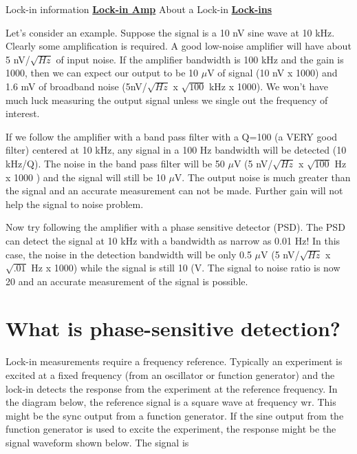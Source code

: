 \documentclass{../lab}
\begin{document}
Lock-in information \href{http://physics111.lib.berkeley.edu/Physics111/Reprints/NMR/Lock-in-Amp.pdf}{\textbf{Lock-in Amp}} About a Lock-in \href{http://physics111.lib.berkeley.edu/Physics111/Reprints/NMR/About-Lock-Ins.pdf}{\textbf{Lock-ins}}

Let's consider an example. Suppose the signal is a 10 nV sine wave at 10 kHz. Clearly some amplification is required. A good low-noise amplifier will have about 5 nV/$ \sqrt{Hz} $ of input noise. If the amplifier bandwidth is 100 kHz and the gain is 1000, then we can expect our output to be 10 $ \mu $V of signal (10 nV x 1000) and 1.6 mV of broadband noise (5nV/$ \sqrt{Hz} $ x $ \sqrt{100} $ kHz x 1000). We won't have much luck measuring the output signal unless we single out the frequency of interest.

If we follow the amplifier with a band pass filter with a Q=100 (a VERY good filter) centered at 10 kHz, any signal in a 100 Hz bandwidth will be detected (10 kHz/Q). The noise in the band pass filter will be 50 $ \mu $V (5 nV/$ \sqrt{Hz} $ x $ \sqrt{100} $ Hz x 1000 ) and the signal will still be 10 $ \mu $V. The output noise is much greater than the signal and an accurate measurement can not be made. Further gain will not help the signal to noise problem.

Now try following the amplifier with a phase sensitive detector (PSD). The PSD can detect the signal at 10 kHz with a bandwidth as narrow as 0.01 Hz! In this case, the noise in the detection bandwidth will be only 0.5 $ \mu $V (5 nV/$ \sqrt{Hz} $ x $ \sqrt{.01} $ Hz x 1000) while the signal is still 10 (V. The signal to noise ratio is now 20 and an accurate measurement of the signal is possible.

\section{What is phase-sensitive detection?}

Lock-in measurements require a frequency reference. Typically an experiment is excited at a fixed frequency (from an oscillator or function generator) and the lock-in detects the response from the experiment at the reference frequency. In the diagram below, the reference signal is a square wave at frequency wr. This might be the sync output from a function generator. If the sine output from the function generator is used to excite the experiment, the response might be the signal waveform shown below. The signal is
\end{document}
